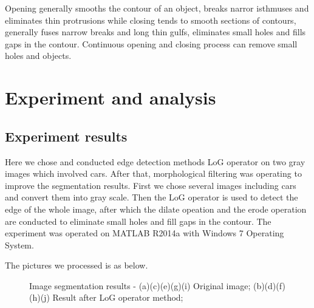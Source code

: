 \documentclass[journal]{IEEEtran}
\begin{document}
Opening generally smooths the contour of an object, breaks narror isthmuses and eliminates thin protrusions while closing tends to smooth sections of contours, generally fuses narrow breaks and long thin gulfs, eliminates small holes and fills gaps in the contour. Continuous opening and closing process can remove small holes and objects.



\section{Experiment and analysis}
\subsection{Experiment results}
Here we chose and conducted edge detection methods LoG operator on two gray images which involved cars. After that, morphological filtering was operating to improve the segmentation results. First we chose several images including cars and convert them into gray scale. Then the LoG operator is used to detect the edge of the whole image, after which the dilate opeation and the erode operation are conducted to eliminate small holes and fill gaps in the contour. The experiment was operated on MATLAB R2014a with Windows 7 Operating System.

The pictures we processed is as below. 

\begin{figure}[a]
  \centering
    
  \centering
    
  \centering
    
  \centering
    
  \centering
  \caption{Image segmentation results - (a)(c)(e)(g)(i) Original image; (b)(d)(f)(h)(j) Result after LoG operator method; }
  \label{f5} %
\end{figure}
\end{document}
